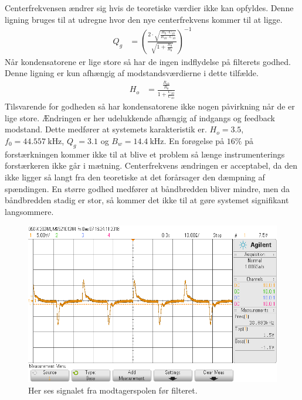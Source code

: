 Centerfrekvensen ændrer sig hvis de teoretiske værdier ikke kan opfyldes. Denne ligning bruges til at udregne hvor den nye centerfrekvens kommer til at ligge.
\begin{align}
	Q_g & = \left( \frac{2 \cdot \sqrt{\frac{R_9 \cdot C_{10}}{R_{10} \cdot C_{10}}}}{\sqrt{1+\frac{R_9}{R_8}}} \right)^{-1}
	\end{align}
Når kondensatorene er lige store så har de ingen indflydelse på filterets godhed. Denne ligning er kun afhængig af modstandsværdierne i dette tilfælde.
\begin{align}
	H_o & = \frac{\frac{R_{10}}{R_8}}{1+\frac{C_{10}}{C_{10}}}
\end{align}
Tilsvarende for godheden så har kondensatorene ikke nogen påvirkning når de er lige store.
Ændringen er her udelukkende afhængig af indgangs og feedback modstand.
Dette medfører at systemets karakteristik er. 
$H_o = \num{3.5}$, $f_0 = \SI{44.557}{\kilo\hertz}$, $Q_g = \num{3.1}$ og $B_w = \SI{14.4}{\kilo\hertz}$. 
En forøgelse på $16 \%$ på forstærkningen kommer ikke til at blive et problem så længe instrumenterings forstærkeren ikke går i mætning. 
Centerfrekvens ændringen er acceptabel, da den ikke ligger så langt fra den teoretiske at det forårsager den dæmpning af spændingen.
En større godhed medfører at båndbredden bliver mindre, men da båndbredden stadig er stor, så kommer det ikke til at gøre systemet signifikant langsommere.
\begin{figure}[h!]
	\centering
	\includegraphics[width=1\textwidth]{billeder/filter_in_png.png}
	\caption{Her ses signalet fra modtagerspolen før filteret.}
	\label{fig:filter_in}
\end{figure}
\FloatBlock

